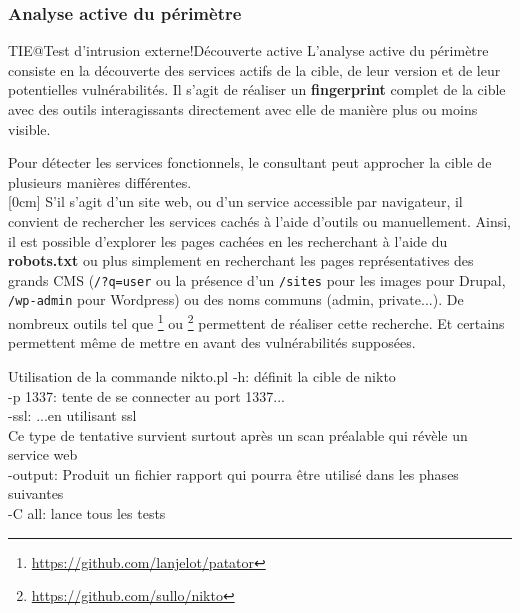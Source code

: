 \documentclass[twoside,a4paper,12pt,titlepage]{book}
\newcommand{\MarginPar}[2]{\marginnote{\scriptsize #1}[#2]}
\begin{document}
\subsubsection{Analyse active du périmètre}
\begin{Define}{TIE@Test d'intrusion externe!Découverte active} L'analyse active du périmètre consiste en la découverte des services actifs de la cible, de leur version et de leur potentielles vulnérabilités. Il s'agit de réaliser un \textbf{fingerprint} complet de la cible avec des outils interagissants directement avec elle de manière plus ou moins visible.\end{Define}
	Pour détecter les services fonctionnels, le consultant peut approcher la cible de plusieurs manières différentes.\\
	\MarginPar{\textbf{Directory Discovery}}{0cm}
	S'il s'agit d'un site web, ou d'un service accessible par navigateur, il convient de rechercher les services cachés à l'aide d'outils ou manuellement. Ainsi, il est possible d'explorer les pages cachées en les recherchant à l'aide du \textbf{robots.txt} ou plus simplement en recherchant les pages représentatives des grands \gls{CMS} (\texttt{/?q=user} ou la présence d'un \texttt{/sites} pour les images pour Drupal, \texttt{/wp-admin} pour Wordpress) ou des noms communs (admin, private...). De nombreux outils tel que \footnote{\url{https://github.com/lanjelot/patator}} ou \footnote{\url{https://github.com/sullo/nikto}} permettent de réaliser cette recherche. Et certains permettent même de mettre en avant des vulnérabilités supposées.
\begin{FlagConsole}{Utilisation de la commande nikto.pl}
	\tcblower
	-h: définit la cible de nikto\\
	-p 1337: tente de se connecter au port 1337... \\
	-ssl: ...en utilisant ssl\\
		Ce type de tentative survient surtout après un scan préalable qui révèle un service web\\
	-output: Produit un fichier rapport qui pourra être utilisé dans les phases suivantes\\
	-C all: lance tous les tests
\end{FlagConsole}
\end{document}

